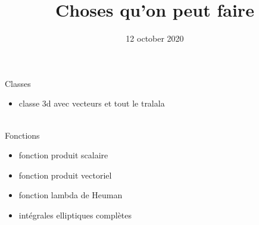 \documentclass[a4paper,1pt]{article}
\title{Choses qu'on peut faire}
\date{12 october 2020}
\begin{document}
\maketitle

Classes
\begin{itemize}
    \item classe 3d avec vecteurs et tout le tralala
\end{itemize}
~\\

Fonctions
\begin{itemize}
    \item fonction produit scalaire
    \item fonction produit vectoriel
    \item fonction lambda de Heuman
    \item intégrales elliptiques complètes
\end{itemize}
\end{document}
